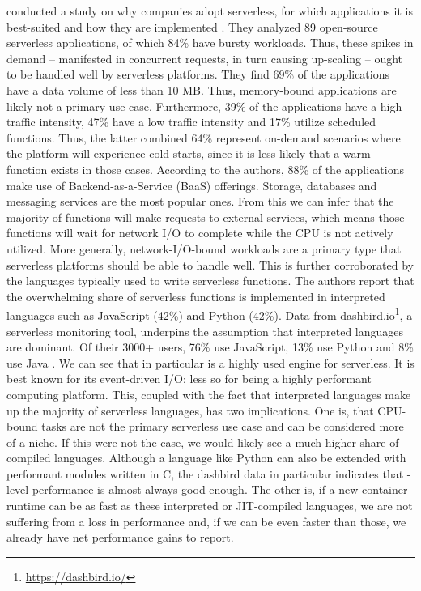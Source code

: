 \citeauthor{Eismann2021} conducted a study on why companies adopt serverless, for which applications it is best-suited and how they are implemented \cite{Eismann2021}. They analyzed 89 open-source serverless applications, of which 84\% have bursty workloads. Thus, these spikes in demand -- manifested in concurrent requests, in turn causing up-scaling  -- ought to be handled well by serverless platforms.
They find 69\% of the applications have a data volume of less than 10 MB. Thus, memory-bound applications are likely not a primary use case. Furthermore, 39\% of the applications have a high traffic intensity, 47\% have a low traffic intensity and 17\% utilize scheduled functions. Thus, the latter combined 64\% represent on-demand scenarios where the platform will experience cold starts, since it is less likely that a warm function exists in those cases. According to the authors, 88\% of the applications make use of Backend-as-a-Service (BaaS) offerings. Storage, databases and messaging services are the most popular ones. From this we can infer that the majority of functions will make requests to external services, which means those functions will wait for network I/O to complete while the CPU is not actively utilized. More generally, network-I/O-bound workloads are a primary type that serverless platforms should be able to handle well. This is further corroborated by the languages typically used to write serverless functions. The authors report that the overwhelming share of serverless functions is implemented in interpreted languages such as JavaScript (42\%) and Python (42\%). Data from dashbird.io\footnote{\url{https://dashbird.io/}}, a serverless monitoring tool, underpins the assumption that interpreted languages are dominant. Of their 3000+ users, 76\% use JavaScript, 13\% use Python and 8\% use Java \cite{Rehemaegi2019}. We can see that  in particular is a highly used engine for serverless. It is best known for its event-driven I/O; less so for being a highly performant computing platform. This, coupled with the fact that interpreted languages make up the majority of serverless languages, has two implications.
One is, that CPU-bound tasks are not the primary serverless use case and can be considered more of a niche. If this were not the case, we would likely see a much higher share of compiled languages. Although a language like Python can also be extended with performant modules written in C, the dashbird data in particular indicates that -level performance is almost always good enough.
The other is, if a new container runtime can be as fast as these interpreted or JIT-compiled languages, we are not suffering from a loss in performance and, if we can be even faster than those, we already have net performance gains to report.

